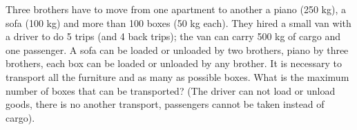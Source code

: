 \problem
Three brothers have to move from one apartment to another a piano
(250 kg), a sofa (100 kg) and more than 100 boxes (50 kg each).
They hired a small van with a driver to do 5 trips (and 4 back trips);
the van can carry 500 kg of cargo and one passenger.
A sofa can be loaded or unloaded by two brothers, piano by three brothers, each
box can be loaded or unloaded by any brother.
It is necessary to transport all the furniture and as many as possible boxes.
What is the maximum number of boxes that can be transported?
(The driver can not load or unload goods, there is no another transport,
passengers cannot be taken instead of cargo).
\solution
\endproblem
